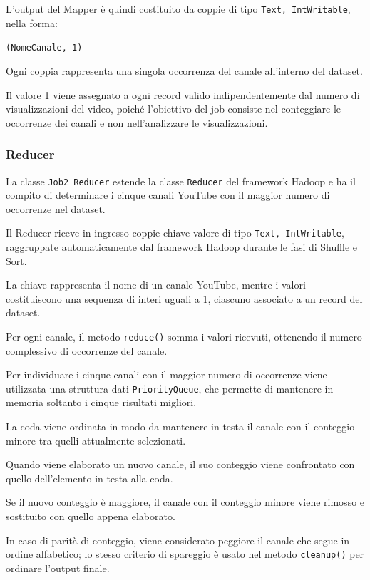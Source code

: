 \documentclass[12pt, a4paper]{article}
\begin{document}
L'output del Mapper è quindi costituito da
coppie di tipo \texttt{Text, IntWritable},
nella forma:

\begin{center}
    \texttt{(NomeCanale, 1)}
\end{center}

Ogni coppia rappresenta una singola occorrenza
del canale all'interno del dataset.

Il valore 1 viene assegnato a ogni record valido
indipendentemente dal numero di visualizzazioni
del video, poiché l'obiettivo del job consiste
nel conteggiare le occorrenze dei canali e non
nell'analizzare le visualizzazioni.

\subsubsection{Reducer}

La classe \texttt{Job2\_Reducer} estende la classe
\texttt{Reducer} del framework Hadoop e ha il compito
di determinare i cinque canali YouTube con il maggior
numero di occorrenze nel dataset.

Il Reducer riceve in ingresso coppie chiave-valore
di tipo \texttt{Text, IntWritable}, raggruppate
automaticamente dal framework Hadoop durante le
fasi di Shuffle e Sort.

La chiave rappresenta il nome di un canale YouTube,
mentre i valori costituiscono una sequenza di interi
uguali a 1, ciascuno associato a un record del dataset.

Per ogni canale, il metodo \texttt{reduce()} somma
i valori ricevuti, ottenendo il numero complessivo
di occorrenze del canale.

Per individuare i cinque canali con il maggior
numero di occorrenze viene utilizzata una struttura
dati \texttt{PriorityQueue}, che permette di mantenere
in memoria soltanto i cinque risultati migliori.

La coda viene ordinata in modo da mantenere
in testa il canale con il conteggio minore
tra quelli attualmente selezionati.

Quando viene elaborato un nuovo canale,
il suo conteggio viene confrontato con quello
dell'elemento in testa alla coda.

Se il nuovo conteggio è maggiore, il canale
con il conteggio minore viene rimosso e
sostituito con quello appena elaborato.

In caso di parità di conteggio, viene considerato
peggiore il canale che segue in ordine alfabetico;
lo stesso criterio di spareggio è usato nel metodo
\texttt{cleanup()} per ordinare l'output finale.
\end{document}
